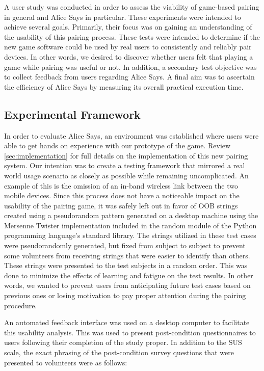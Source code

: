 
A user study was conducted in order to assess the viability of game-based
pairing in general and Alice Says in particular. These experiments were
intended to achieve several goals. Primarily, their focus was on gaining an
understanding of the usability of this pairing process. These tests were
intended to determine if the new game software could be used by real users to
consistently and reliably pair devices. In other words, we desired to discover
whether users felt that playing a game while pairing was useful or not. In
addition, a secondary test objective was to collect feedback from users regarding
Alice Says. A final aim was to ascertain the efficiency of Alice Says by
measuring its overall practical execution time.

\subsection{Experimental Framework}
\label{sec:framework}

In order to evaluate Alice Says, an environment was established where users
were able to get hands on experience with our prototype of the game. Review
\ref{sec:implementation} for full details on the implementation of this new
pairing system. Our intention was to create a testing framework that mirrored a
real world usage scenario as closely as possible while remaining uncomplicated.
An example of this is the omission of an in-band wireless link between the two
mobile devices. Since this process does not have a noticeable impact on the
usability of the pairing game, it was safely left out in favor of OOB strings
created using a pseudorandom pattern generated on a desktop machine using the
Mersenne Twister \cite{mersenne_twister} implementation included in the random
module of the Python programming language's standard library. The strings
utilized in these test cases were pseudorandomly generated, but fixed from
subject to subject to prevent some volunteers from receiving strings that were
easier to identify than others. These strings were presented to the test
subjects in a random order. This was done to minimize the effects of learning
and fatigue on the test results. In other words, we wanted to prevent users
from anticipating future test cases based on previous ones or losing motivation
to pay proper attention during the pairing procedure.

An automated feedback interface was used on a desktop computer to facilitate
this usability analysis. This was used to present post-condition questionnaires
to users following their completion of the study proper. In addition to the SUS scale, the exact phrasing of the post-condition survey questions that were presented to volunteers were as follows:

